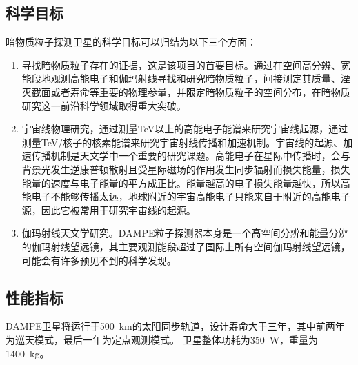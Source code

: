 \subsection{科学目标}
暗物质粒子探测卫星的科学目标可以归结为以下三个方面：
\begin{enumerate}
	\item 寻找暗物质粒子存在的证据，这是该项目的首要目标。通过在空间高分辨、宽能段地观测高能电子和伽玛射线寻找和研究暗物质粒子，间接测定其质量、湮灭截面或者寿命等重要的物理参量，并限定暗物质粒子的空间分布，在暗物质研究这一前沿科学领域取得重大突破。
	\item 宇宙线物理研究，通过测量TeV以上的高能电子能谱来研究宇宙线起源，通过测量TeV/核子的核素能谱来研究宇宙射线传播和加速机制。宇宙线的起源、加速传播机制是天文学中一个重要的研究课题。高能电子在星际中传播时，会与背景光发生逆康普顿散射且受星际磁场的作用发生同步辐射而损失能量，损失能量的速度与电子能量的平方成正比。能量越高的电子损失能量越快，所以高能电子不能够传播太远，地球附近的宇宙高能电子只能来自于附近的高能电子源，因此它被常用于研究宇宙线的起源。
	\item 伽玛射线天文学研究。DAMPE粒子探测器本身是一个高空间分辨和能量分辨的伽玛射线望远镜，其主要观测能段超过了国际上所有空间伽玛射线望远镜，可能会有许多预见不到的科学发现。
\end{enumerate}

    
\subsection{性能指标}
DAMPE卫星将运行于\SI{500}{\kilo\meter}的太阳同步轨道，设计寿命大于三年，其中前两年为巡天模式，最后一年为定点观测模式。
卫星整体功耗为\SI{350}{W}，重量为\SI{1400}{kg}。


